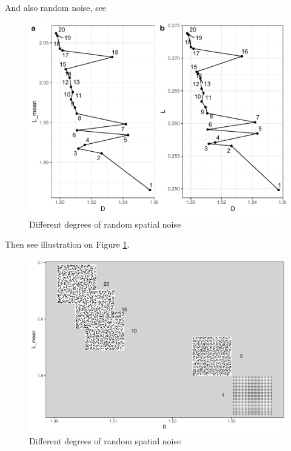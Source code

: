 \documentclass[
  12pt,
]{book}
\begin{document}
And also random noise, see



\begin{figure}

{\centering \includegraphics[width=0.9\linewidth]{bookdown-demo_files/figure-latex/08-noise-1} 

}

\caption{Different degrees of random spatial noise}\label{fig:08-noise}
\end{figure}

Then see illustration on Figure \ref{fig:08-noise}.

\begin{figure}
\hypertarget{fig:08-noise-im}{%
\centering
\includegraphics{Results/fig08_noise_im.pdf}
\caption{Different degrees of random spatial noise}\label{fig:08-noise-im}
}
\end{figure}
\end{document}
